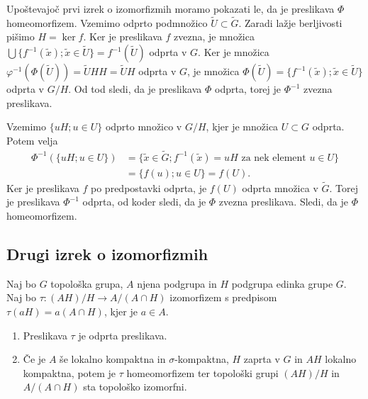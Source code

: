 \documentclass[mat1]{fmfdelo}
\begin{document}
\begin{dokaz}
Upoštevajoč prvi izrek o izomorfizmih moramo pokazati le, da je preslikava $\Phi$ homeomorfizem. Vzemimo odprto podmnožico $\widetilde{U} \subset \widetilde{G}$. Zaradi lažje berljivosti pišimo $H = \ker f$.
Ker je preslikava $f$ zvezna, je množica $\bigcup\lbrace f^{-1}(\tilde{x}) ; \tilde{x} \in \widetilde{U} \rbrace = f^{-1}(\widetilde{U})$ odprta v $G$. Ker je množica $\varphi^{-1}(\Phi(\widetilde{U})) = \widetilde{U}HH = \widetilde{U}H$ odprta v $G$, je množica $\Phi(\widetilde{U}) = \lbrace f^{-1}(\tilde{x}) ; \tilde{x} \in \widetilde{U} \rbrace$ odprta v $G/H$. Od tod sledi, da je preslikava $\Phi$ odprta, torej je $\Phi^{-1}$ zvezna preslikava.

Vzemimo $\lbrace uH ; u \in U \rbrace$ odprto množico v $G/H$, kjer je množica $U \subset G$ odprta. Potem velja
\begin{align*}
\Phi^{-1}(\lbrace uH ; u \in U \rbrace) &= \lbrace \tilde{x} \in \widetilde{G} ; f^{-1}(\tilde{x}) = uH \text{ za nek element } u \in U \rbrace \\
&= \lbrace f(u) ; u \in U \rbrace = f(U).
\end{align*}
Ker je preslikava $f$ po predpostavki odprta, je $f(U)$ odprta množica v $\widetilde{G}$. Torej je preslikava $\Phi^{-1}$ odprta, od koder sledi, da je $\Phi$ zvezna preslikava. Sledi, da je $\Phi$ homeomorfizem.
\end{dokaz}

\subsection{Drugi izrek o izomorfizmih}
\begin{izrek}\label{izr:drugitopizrek}
Naj bo $G$ topološka grupa, $A$ njena podgrupa in $H$ podgrupa edinka grupe $G$. Naj bo $\tau\colon (AH)/H \to A/(A \cap H)$ izomorfizem s predpisom $\tau (aH) = a(A \cap H)$, kjer je $a \in A$.
\begin{enumerate}
\item Preslikava $\tau$ je odprta preslikava. \label{podtrd:ioi2-1}
\item Če je $A$ še lokalno kompaktna in $\sigma$-kompaktna, $H$ zaprta v $G$ in $AH$ lokalno kompaktna, potem je $\tau$ homeomorfizem ter topološki grupi $(AH)/H$ in $A/(A \cap H)$ sta topološko izomorfni. \label{podtrd:ioi2-2}
\end{enumerate}
\end{izrek}
\end{document}
